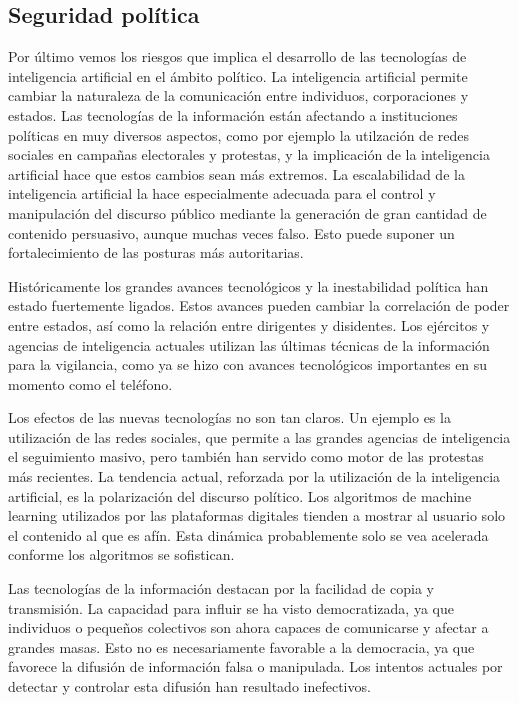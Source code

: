 \documentclass[12pt,a4paper]{article}
\begin{document}
\subsection{Seguridad política}

Por último vemos los riesgos que implica el desarrollo de las tecnologías de inteligencia artificial en el ámbito político. La inteligencia artificial permite cambiar la naturaleza de la comunicación entre individuos, corporaciones y estados. Las tecnologías de la información están afectando a instituciones políticas en muy diversos aspectos, como por ejemplo la utilzación de redes sociales en campañas electorales y protestas, y la implicación de la inteligencia artificial hace que estos cambios sean más extremos. La escalabilidad de la inteligencia artificial la hace especialmente adecuada para el control y manipulación del discurso público mediante la generación de gran cantidad de contenido persuasivo, aunque muchas veces falso. Esto puede suponer un fortalecimiento de las posturas más autoritarias.

Históricamente los grandes avances tecnológicos y la inestabilidad política han estado fuertemente ligados. Estos avances pueden cambiar la correlación de poder entre estados, así como la relación entre dirigentes y disidentes. Los ejércitos y agencias de inteligencia actuales utilizan las últimas técnicas de la información para la vigilancia, como ya se hizo con avances tecnológicos importantes en su momento como el teléfono.

Los efectos de las nuevas tecnologías no son tan claros. Un ejemplo es la utilización de las redes sociales, que permite a las grandes agencias de inteligencia el seguimiento masivo, pero también han servido como motor de las protestas más recientes. La tendencia actual, reforzada por la utilización de la inteligencia artificial, es la polarización del discurso político. Los algoritmos de machine learning utilizados por las plataformas digitales tienden a mostrar al usuario solo el contenido al que es afín. Esta dinámica probablemente solo se vea acelerada conforme los algoritmos se sofistican.

Las tecnologías de la información destacan por la facilidad de copia y transmisión. La capacidad para influir se ha visto democratizada, ya que individuos o pequeños colectivos son ahora capaces de comunicarse y afectar a grandes masas. Esto no es necesariamente favorable a la democracia, ya que favorece la difusión de información falsa o manipulada. Los intentos actuales por detectar y controlar esta difusión han resultado inefectivos.
\end{document}
